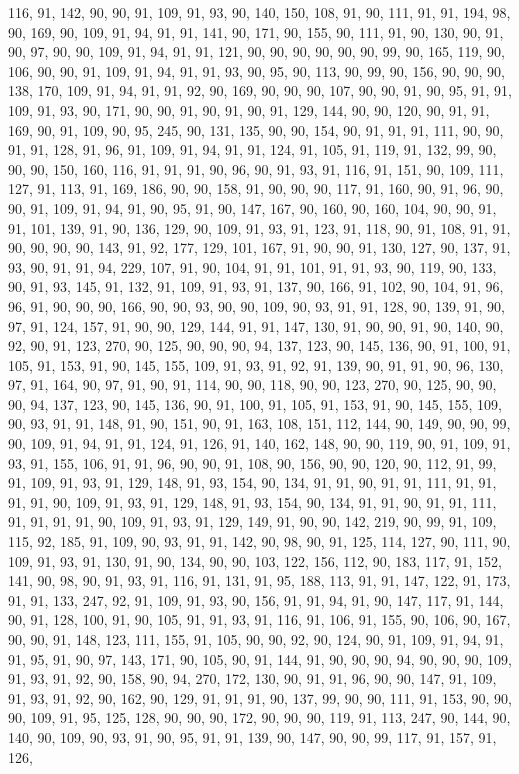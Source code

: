 \begin{sloppypar}
116, 91, 142, 90, 90, 91, 109, 91, 93, 90, 140, 150, 108, 91, 90, 111, 91, 91, 194, 98, 90, 169, 90, 109, 91, 94, 91, 91, 141, 90, 171, 90, 155, 90, 111, 91, 90, 130, 90, 91, 90, 97, 90, 90, 109, 91, 94, 91, 91, 121, 90, 90, 90, 90, 90, 90, 99, 90, 165, 119, 90, 106, 90, 90, 91, 109, 91, 94, 91, 91, 93, 90, 95, 90, 113, 90, 99, 90, 156, 90, 90, 90, 138, 170, 109, 91, 94, 91, 91, 92, 90, 169, 90, 90, 90, 107, 90, 90, 91, 90, 95, 91, 91, 109, 91, 93, 90, 171, 90, 90, 91, 90, 91, 90, 91, 129, 144, 90, 90, 120, 90, 91, 91, 169, 90, 91, 109, 90, 95, 245, 90, 131, 135, 90, 90, 154, 90, 91, 91, 91, 111, 90, 90, 91, 91, 128, 91, 96, 91, 109, 91, 94, 91, 91, 124, 91, 105, 91, 119, 91, 132, 99, 90, 90, 90, 150, 160, 116, 91, 91, 91, 90, 96, 90, 91, 93, 91, 116, 91, 151, 90, 109, 111, 127, 91, 113, 91, 169, 186, 90, 90, 158, 91, 90, 90, 90, 117, 91, 160, 90, 91, 96, 90, 90, 91, 109, 91, 94, 91, 90, 95, 91, 90, 147, 167, 90, 160, 90, 160, 104, 90, 90, 91, 91, 101, 139, 91, 90, 136, 129, 90, 109, 91, 93, 91, 123, 91, 118, 90, 91, 108, 91, 91, 90, 90, 90, 90, 143, 91, 92, 177, 129, 101, 167, 91, 90, 90, 91, 130, 127, 90, 137, 91, 93, 90, 91, 91, 94, 229, 107, 91, 90, 104, 91, 91, 101, 91, 91, 93, 90, 119, 90, 133, 90, 91, 93, 145, 91, 132, 91, 109, 91, 93, 91, 137, 90, 166, 91, 102, 90, 104, 91, 96, 96, 91, 90, 90, 90, 166, 90, 90, 93, 90, 90, 109, 90, 93, 91, 91, 128, 90, 139, 91, 90, 97, 91, 124, 157, 91, 90, 90, 129, 144, 91, 91, 147, 130, 91, 90, 90, 91, 90, 140, 90, 92, 90, 91, 123, 270, 90, 125, 90, 90, 90, 94, 137, 123, 90, 145, 136, 90, 91, 100, 91, 105, 91, 153, 91, 90, 145, 155, 109, 91, 93, 91, 92, 91, 139, 90, 91, 91, 90, 96, 130, 97, 91, 164, 90, 97, 91, 90, 91, 114, 90, 90, 118, 90, 90, 123, 270, 90, 125, 90, 90, 90, 94, 137, 123, 90, 145, 136, 90, 91, 100, 91, 105, 91, 153, 91, 90, 145, 155, 109, 90, 93, 91, 91, 148, 91, 90, 151, 90, 91, 163, 108, 151, 112, 144, 90, 149, 90, 90, 99, 90, 109, 91, 94, 91, 91, 124, 91, 126, 91, 140, 162, 148, 90, 90, 119, 90, 91, 109, 91, 93, 91, 155, 106, 91, 91, 96, 90, 90, 91, 108, 90, 156, 90, 90, 120, 90, 112, 91, 99, 91, 109, 91, 93, 91, 129, 148, 91, 93, 154, 90, 134, 91, 91, 90, 91, 91, 111, 91, 91, 91, 91, 90, 109, 91, 93, 91, 129, 148, 91, 93, 154, 90, 134, 91, 91, 90, 91, 91, 111, 91, 91, 91, 91, 90, 109, 91, 93, 91, 129, 149, 91, 90, 90, 142, 219, 90, 99, 91, 109, 115, 92, 185, 91, 109, 90, 93, 91, 91, 142, 90, 98, 90, 91, 125, 114, 127, 90, 111, 90, 109, 91, 93, 91, 130, 91, 90, 134, 90, 90, 103, 122, 156, 112, 90, 183, 117, 91, 152, 141, 90, 98, 90, 91, 93, 91, 116, 91, 131, 91, 95, 188, 113, 91, 91, 147, 122, 91, 173, 91, 91, 133, 247, 92, 91, 109, 91, 93, 90, 156, 91, 91, 94, 91, 90, 147, 117, 91, 144, 90, 91, 128, 100, 91, 90, 105, 91, 91, 93, 91, 116, 91, 106, 91, 155, 90, 106, 90, 167, 90, 90, 91, 148, 123, 111, 155, 91, 105, 90, 90, 92, 90, 124, 90, 91, 109, 91, 94, 91, 91, 95, 91, 90, 97, 143, 171, 90, 105, 90, 91, 144, 91, 90, 90, 90, 94, 90, 90, 90, 109, 91, 93, 91, 92, 90, 158, 90, 94, 270, 172, 130, 90, 91, 91, 96, 90, 90, 147, 91, 109, 91, 93, 91, 92, 90, 162, 90, 129, 91, 91, 91, 90, 137, 99, 90, 90, 111, 91, 153, 90, 90, 90, 109, 91, 95, 125, 128, 90, 90, 90, 172, 90, 90, 90, 119, 91, 113, 247, 90, 144, 90, 140, 90, 109, 90, 93, 91, 90, 95, 91, 91, 139, 90, 147, 90, 90, 99, 117, 91, 157, 91, 126, 
\end{sloppypar}
